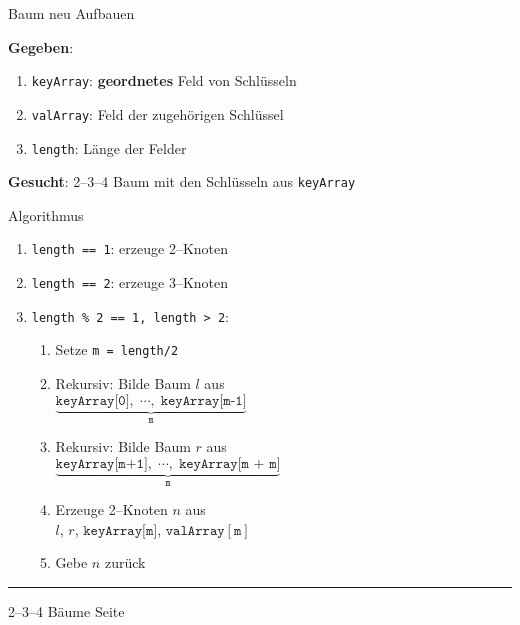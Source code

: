 \begin{slide}{}
\normalsize

\begin{center}
Baum neu Aufbauen
\end{center}
\vspace*{0.5cm}

\footnotesize
\textbf{Gegeben}:
\begin{enumerate}
\item \texttt{keyArray}: \textbf{geordnetes} Feld von Schl\"usseln
\item \texttt{valArray}: Feld der zugeh\"origen Schl\"ussel
\item \texttt{length}: L\"ange der Felder
\end{enumerate}
\textbf{Gesucht}: 2--3--4 Baum mit den Schl\"usseln aus \texttt{keyArray} 

Algorithmus
\begin{enumerate}
\item \texttt{length == 1}: erzeuge 2--Knoten
\item \texttt{length == 2}: erzeuge 3--Knoten
\item \texttt{length \% 2 == 1, length > 2}:
  \begin{enumerate}
  \item Setze \texttt{m = length/2}
  \item Rekursiv: Bilde Baum $l$ aus \\[0.3cm]
        \hspace*{1.3cm} $\underbrace{\texttt{keyArray[0]}, \; \cdots, \;\texttt{keyArray[m-1]}}_\mathtt{\displaystyle m}$
  \item Rekursiv: Bilde Baum $r$ aus \\[0.3cm]
        \hspace*{1.3cm} $\underbrace{\texttt{keyArray[m+1]},\; \cdots, \;\texttt{keyArray[m + m]}}_\mathtt{\displaystyle m}$
  \item Erzeuge 2--Knoten $n$ aus \\[0.3cm]
        \hspace*{1.3cm} $l$, $r$, $\texttt{keyArray[m]}$, $\mathtt{valArray[m]}$
  \item Gebe $n$ zur\"uck
  \end{enumerate}
\end{enumerate}

\vspace*{\fill}
\tiny \addtocounter{mypage}{1}
\rule{17cm}{1mm}
2--3--4 B\"aume  \hspace*{\fill} Seite 
\end{slide}

